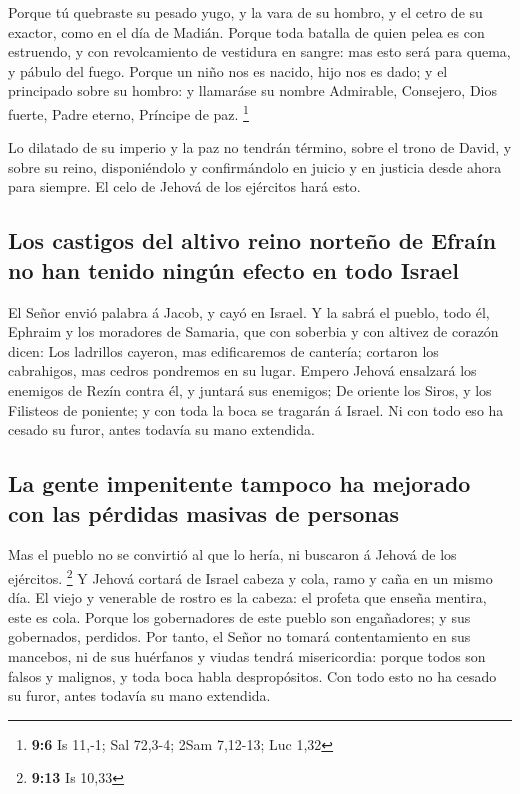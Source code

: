  Porque tú quebraste su pesado yugo, y la vara de su hombro,
y el cetro de su exactor, como en el día de Madián.  Porque
toda batalla de quien pelea es con estruendo, y con revolcamiento de
vestidura en sangre: mas esto será para quema, y pábulo del fuego.
 Porque un niño nos es nacido, hijo nos es dado; y el
principado sobre su hombro: y llamaráse su nombre Admirable, Consejero,
Dios fuerte, Padre eterno, Príncipe de paz. \footnote{\textbf{9:6} Is
  11,-1; Sal 72,3-4; 2Sam 7,12-13; Luc 1,32}

 Lo dilatado de su imperio y la paz no tendrán término,
sobre el trono de David, y sobre su reino, disponiéndolo y confirmándolo
en juicio y en justicia desde ahora para siempre. El celo de Jehová de
los ejércitos hará esto.

\hypertarget{los-castigos-del-altivo-reino-norteuxf1o-de-efrauxedn-no-han-tenido-ninguxfan-efecto-en-todo-israel}{%
\subsection{Los castigos del altivo reino norteño de Efraín no han
tenido ningún efecto en todo
Israel}\label{los-castigos-del-altivo-reino-norteuxf1o-de-efrauxedn-no-han-tenido-ninguxfan-efecto-en-todo-israel}}

 El Señor envió palabra á Jacob, y cayó en Israel.
 Y la sabrá el pueblo, todo él, Ephraim y los moradores de
Samaria, que con soberbia y con altivez de corazón dicen: 
Los ladrillos cayeron, mas edificaremos de cantería; cortaron los
cabrahigos, mas cedros pondremos en su lugar.  Empero
Jehová ensalzará los enemigos de Rezín contra él, y juntará sus
enemigos;  De oriente los Siros, y los Filisteos de
poniente; y con toda la boca se tragarán á Israel. Ni con todo eso ha
cesado su furor, antes todavía su mano extendida.

\hypertarget{la-gente-impenitente-tampoco-ha-mejorado-con-las-puxe9rdidas-masivas-de-personas}{%
\subsection{La gente impenitente tampoco ha mejorado con las pérdidas
masivas de
personas}\label{la-gente-impenitente-tampoco-ha-mejorado-con-las-puxe9rdidas-masivas-de-personas}}

 Mas el pueblo no se convirtió al que lo hería, ni buscaron
á Jehová de los ejércitos. \footnote{\textbf{9:13} Is 10,33}
 Y Jehová cortará de Israel cabeza y cola, ramo y caña en
un mismo día.  El viejo y venerable de rostro es la cabeza:
el profeta que enseña mentira, este es cola.  Porque los
gobernadores de este pueblo son engañadores; y sus gobernados, perdidos.
 Por tanto, el Señor no tomará contentamiento en sus
mancebos, ni de sus huérfanos y viudas tendrá misericordia: porque todos
son falsos y malignos, y toda boca habla despropósitos. Con todo esto no
ha cesado su furor, antes todavía su mano extendida.

